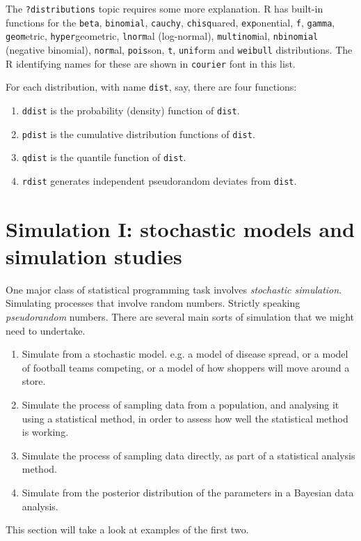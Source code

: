 \documentclass[10pt] {article}
\theoremstyle{definition}
\begin{document}
The {\lstinline+?distributions+} topic requires some more explanation. R has built-in functions for the {\lstinline+beta+}, {\lstinline+binomial+}, {\lstinline+cauchy+}, {\lstinline+chisq+}uared, {\lstinline+exp+}onential, {\lstinline+f+}, {\lstinline+gamma+}, {\lstinline+geom+}etric, {\lstinline+hyper+}geometric, {\lstinline+lnorm+}al (log-normal), {\lstinline+multinom+}ial, {\lstinline+nbinomial+} (negative binomial), {\lstinline+norm+}al, {\lstinline+pois+}son, {\lstinline+t+}, {\lstinline+unif+}orm and {\lstinline+weibull+} distributions. The R identifying names for these are shown in {\lstinline+courier+} font in this list. 

For each distribution, with name {\lstinline+dist+}, say, there are four functions:
\begin{enumerate}
\item {\lstinline+ddist+} is the probability (density) function of {\lstinline+dist+}.
\item {\lstinline+pdist+} is the cumulative distribution functions of {\lstinline+dist+}.
\item {\lstinline+qdist+} is the quantile function of {\lstinline+dist+}.
\item {\lstinline+rdist+} generates independent pseudorandom deviates from {\lstinline+dist+}. 
\end{enumerate}

\section{Simulation I: stochastic models and simulation studies \label{sec:sim1}}

One major class of statistical programming task involves {\em stochastic simulation}. Simulating processes that involve random numbers. Strictly speaking {\em pseudorandom} numbers. There are several main sorts of simulation that we might need to undertake.
\begin{enumerate}
\item Simulate from a stochastic model. e.g. a model of disease spread, or a model of football teams competing, or a model of how shoppers will move around a store.
\item Simulate the process of sampling data from a population, and analysing it using a statistical method, in order to assess how well the statistical method is working. 
\item Simulate the process of sampling data directly, as part of a statistical analysis method.
\item Simulate from the posterior distribution of the parameters in a Bayesian data analysis.
\end{enumerate}  
This section will take a look at examples of the first two. 
\end{document}
